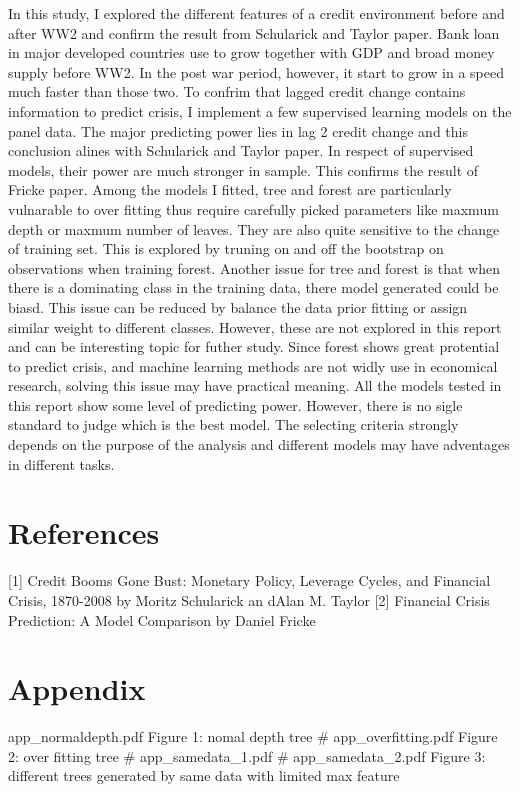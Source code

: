 \documentclass{article}
\begin{document}
In this study, I explored the different features of a credit environment
before and after WW2 and confirm the result from Schularick and Taylor
paper. Bank loan in major developed countries use to grow together with
GDP and broad money supply before WW2. In the post war period, however,
it start to grow in a speed much faster than those two. To confrim that
lagged credit change contains information to predict crisis, I implement
a few supervised learning models on the panel data. The major predicting
power lies in lag 2 credit change and this conclusion alines with
Schularick and Taylor paper. In respect of supervised models, their
power are much stronger in sample. This confirms the result of Fricke
paper. Among the models I fitted, tree and forest are particularly
vulnarable to over fitting thus require carefully picked parameters like
maxmum depth or maxmum number of leaves. They are also quite sensitive
to the change of training set. This is explored by truning on and off
the bootstrap on observations when training forest. Another issue for
tree and forest is that when there is a dominating class in the training
data, there model generated could be biasd. This issue can be reduced by
balance the data prior fitting or assign similar weight to different
classes. However, these are not explored in this report and can be
interesting topic for futher study. Since forest shows great protential
to predict crisis, and machine learning methods are not widly use in
economical research, solving this issue may have practical meaning. All
the models tested in this report show some level of predicting power.
However, there is no sigle standard to judge which is the best model.
The selecting criteria strongly depends on the purpose of the analysis
and different models may have adventages in different tasks.

\section*{References}

{[}1{]} Credit Booms Gone Bust: Monetary Policy, Leverage Cycles, and
Financial Crisis, 1870-2008 by Moritz Schularick an dAlan M. Taylor
{[}2{]} Financial Crisis Prediction: A Model Comparison by Daniel Fricke

\section*{Appendix}

app\_normaldepth.pdf
Figure 1: nomal depth tree \# app\_overfitting.pdf Figure 2: over
fitting tree \# app\_samedata\_1.pdf \# app\_samedata\_2.pdf Figure 3:
different trees generated by same data with limited max feature
\end{document}
